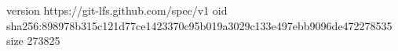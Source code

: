 version https://git-lfs.github.com/spec/v1
oid sha256:898978b315c121d77ce1423370c95b019a3029c133e497ebb9096de472278535
size 273825
